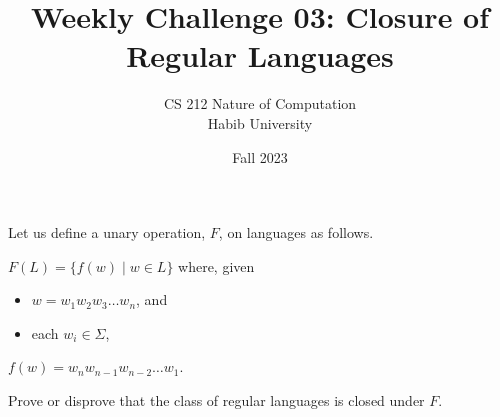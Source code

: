 \documentclass[a4paper]{exam}
\title{Weekly Challenge 03: Closure of Regular Languages}
\author{CS 212 Nature of Computation\\Habib University}
\date{Fall 2023}
\begin{document}
\maketitle

\begin{questions}
  

  Let us define a unary operation, $F$, on languages as follows.
  
  \begin{mdframed}
    $F(L) = \{ f(w) \mid w\in L\}$ where, given
    \begin{itemize}
    \item $w=w_1w_2w_3\ldots w_n$, and
    \item each $w_i\in\Sigma$,
    \end{itemize}
    $f(w) = w_nw_{n-1}w_{n-2}\ldots w_1$.
  \end{mdframed}

  Prove or disprove that the class of regular languages is closed under $F$.

    
  
\end{questions}
\end{document}
